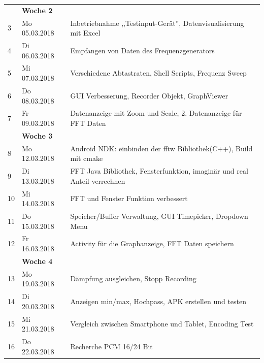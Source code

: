 \documentclass{article}
\begin{document}
{\begin{tabular}{l|p{2.5cm}|p{15cm}}
		& \textbf{Woche 2}&\\

		
		3 & Mo 05.03.2018	 & 
			Inbetriebnahme ,,Testinput-Gerät'', Datenvisualisierung mit Excel\\


	
		4 & Di 06.03.2018 & 
			Empfangen von Daten des Frequenzgenerators\\

	
		5 & Mi 07.03.2018 & 
			Verschiedene Abtastraten, Shell Scripts, Frequenz Sweep\\

	
		6 & Do 08.03.2018 & 
			GUI Verbesserung, Recorder Objekt, GraphViewer \\

	
		7 & Fr 09.03.2018 & 
			Datenanzeige mit Zoom und Scale, 2. Datenanzeige für FFT Daten\\
			

		& \textbf{Woche 3}&\\

	
		8 & Mo 12.03.2018 & 
			Android NDK: einbinden der fftw Bibliothek(C++), Build mit cmake\\

	
		9 & Di 13.03.2018 & 
			FFT Java Bibliothek, Fensterfunktion, imaginär und real Anteil verrechnen \\

		
		10 & Mi 14.03.2018 & 
		FFT und Fenster Funktion verbessert\\

		
		11 & Do 15.03.2018  & 
		Speicher/Buffer Verwaltung, GUI Timepicker, Dropdown Menu\\

		12 & Fr 16.03.2018 & 
		 Activity für die Graphanzeige, FFT Daten speichern\\
		 

		 & \textbf{Woche 4}&\\

		 
		 13 & Mo 19.03.2018	 & 
		 Dämpfung ausgleichen, Stopp Recording \\

		 
		 14 & Di 20.03.2018	 & 
		 Anzeigen min/max, Hochpass, APK erstellen und testen\\

		 15 & Mi 21.03.2018 & 
		 Vergleich zwischen Smartphone und Tablet, Encoding Test \\

		 16 & Do 22.03.2018 & 
		 Recherche PCM 16/24 Bit\\


\end{tabular}}
\end{document}

